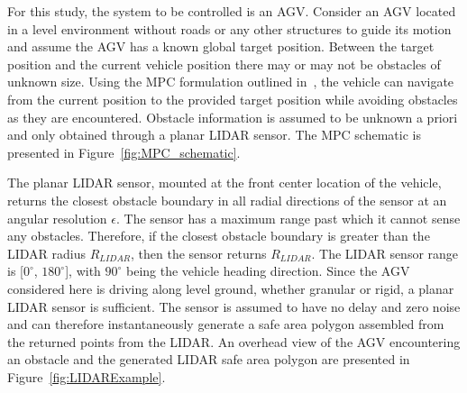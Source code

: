 \documentclass[12pt,onecolumn]{report}
\begin{document}
For this study, the system to be controlled is an AGV. Consider an AGV located in a level environment without roads or any other structures to guide its motion and assume the AGV has a known global target position. Between the target position and the current vehicle position there may or may not be obstacles of unknown size. Using the MPC formulation outlined in~\cite{ModelFidelity2016}, the vehicle can navigate from the current position to the provided target position while avoiding obstacles as they are encountered. Obstacle information is assumed to be unknown a priori and only obtained through a planar LIDAR sensor. The MPC schematic is presented in Figure~\ref{fig:MPC_schematic}.
%

The planar LIDAR sensor, mounted at the front center location of the vehicle, returns the closest obstacle boundary in all radial directions of the sensor at an angular resolution $\epsilon$. The sensor has a maximum range past which it cannot sense any obstacles. Therefore, if the closest obstacle boundary is greater than the LIDAR radius $R_{LIDAR}$, then the sensor returns $R_{LIDAR}$. The LIDAR sensor range is [$0^\circ$, $180^\circ$], with $90^\circ$ being the vehicle heading direction. Since the AGV considered here is driving along level ground, whether granular or rigid, a planar LIDAR sensor is sufficient. The sensor is assumed to have no delay and zero noise and can therefore instantaneously generate a safe area polygon assembled from the returned points from the LIDAR. An overhead view of the AGV encountering an obstacle and the generated LIDAR safe area polygon are presented in Figure~\ref{fig:LIDARExample}. 
%
\end{document}

